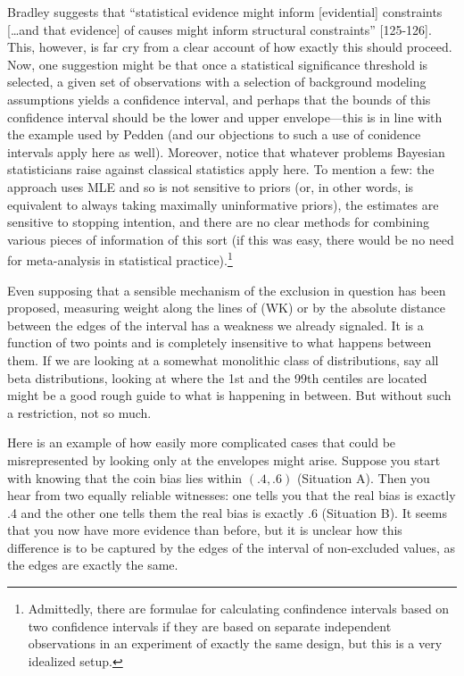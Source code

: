 \documentclass[
  10pt,
  dvipsnames,enabledeprecatedfontcommands]{scrartcl}
\begin{document}
Bradley suggests that ``statistical evidence might inform
{[}evidential{]} constraints {[}\dots and that evidence{]} of causes
might inform structural constraints'' {[}125-126{]}. This, however, is
far cry from a clear account of how exactly this should proceed. Now,
one suggestion might be that once a statistical significance threshold
is selected, a given set of observations with a selection of background
modeling assumptions yields a confidence interval, and perhaps that the
bounds of this confidence interval should be the lower and upper
envelope---this is in line with the example used by Pedden (and our
objections to such a use of conidence intervals apply here as well).
Moreover, notice that whatever problems Bayesian statisticians raise
against classical statistics apply here. To mention a few: the approach
uses MLE and so is not sensitive to priors (or, in other words, is
equivalent to always taking maximally uninformative priors), the
estimates are sensitive to stopping intention, and there are no clear
methods for combining various pieces of information of this sort (if
this was easy, there would be no need for meta-analysis in statistical
practice).\footnote{Admittedly, there are formulae for calculating confindence intervals based on two confidence intervals if they are based on separate independent observations in an experiment of exactly the same design, but this is a very idealized setup.}

Even supposing that a sensible mechanism of the exclusion in question
has been proposed, measuring weight along the lines of (WK) or by the
absolute distance between the edges of the interval has a weakness we
already signaled. It is a function of two points and is completely
insensitive to what happens between them. If we are looking at a
somewhat monolithic class of distributions, say all beta distributions,
looking at where the 1st and the 99th centiles are located might be a
good rough guide to what is happening in between. But without such a
restriction, not so much.

Here is an example of how easily more complicated cases that could be
misrepresented by looking only at the envelopes might arise. Suppose you
start with knowing that the coin bias lies within \((.4, .6)\)
(Situation A). Then you hear from two equally reliable witnesses: one
tells you that the real bias is exactly .4 and the other one tells them
the real bias is exactly .6 (Situation B). It seems that you now have
more evidence than before, but it is unclear how this difference is to
be captured by the edges of the interval of non-excluded values, as the
edges are exactly the same.
\end{document}
